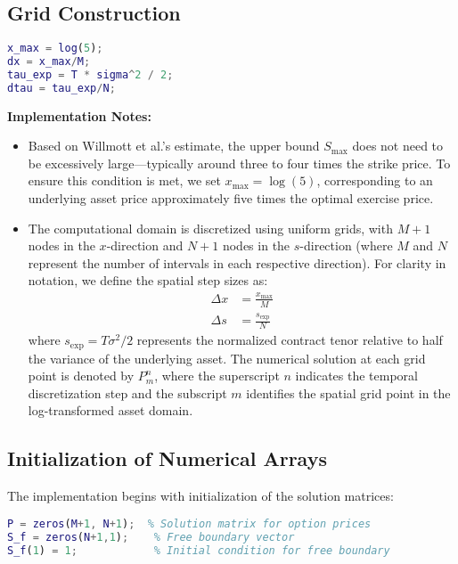 \documentclass{article}
\begin{document}
\subsection{Grid Construction}
\label{subsec:grid}
\begin{lstlisting}[language=Matlab,caption={Spatial/temporal discretization},label=code:grid]
x_max = log(5); 
dx = x_max/M;       
tau_exp = T * sigma^2 / 2;  
dtau = tau_exp/N;   
\end{lstlisting}
\textbf{Implementation Notes:}  
\begin{itemize}
    \item Based on Willmott et al.'s estimate, the upper bound \( S_{\text{max}} \) does not need to be excessively large—typically around three to four times the strike price. To ensure this condition is met, we set \( x_{\text{max}} = \log(5) \), corresponding to an underlying asset price approximately five times the optimal exercise price.
    \item The computational domain is discretized using uniform grids, with $M+1$ nodes in the $x$-direction and $N+1$ nodes in the $s$-direction (where $M$ and $N$ represent the number of intervals in each respective direction). For clarity in notation, we define the spatial step sizes as:
    \begin{align*}
        \Delta x &= \frac{x_{\text{max}}}{M} \\
        \Delta s &= \frac{s_{\text{exp}}}{N}
    \end{align*}
    where $s_{\text{exp}} = T\sigma^2/2$ represents the normalized contract tenor relative to half the variance of the underlying asset. The numerical solution at each grid point is denoted by $P^n_m$, where the superscript $n$ indicates the temporal discretization step and the subscript $m$ identifies the spatial grid point in the log-transformed asset domain.
\end{itemize}
\subsection{Initialization of Numerical Arrays}
The implementation begins with initialization of the solution matrices:

\begin{lstlisting}[language=Matlab, caption=Array initialization, label=code:init]
P = zeros(M+1, N+1);  % Solution matrix for option prices
S_f = zeros(N+1,1);    % Free boundary vector
S_f(1) = 1;            % Initial condition for free boundary
\end{lstlisting}
\end{document}
